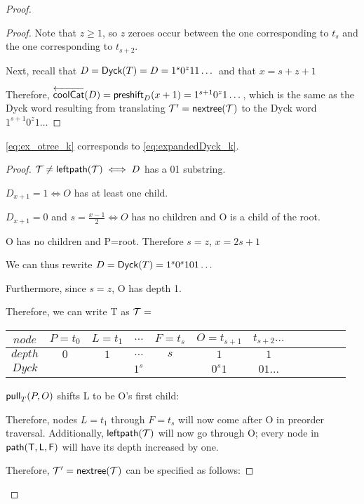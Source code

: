 \begin{proof}
\begin{proof}
    Note that $z \ge 1$, so $z$ zeroes occur between the one corresponding to $t_{s}$ and the one corresponding to $t_{s+2}$.


    Next, recall that $D=\dyck{T}=D=1^s0^z11\dots$ and that $x=s+z+1$

    Therefore, $\coolCat{D}=\preshift{D}{x+1}=1^{s+1}0^z1\dots$, which is the same as the Dyck word resulting from translating $\tree{T}'=\nextTree{T}$ to the Dyck word $1^{s+1}0^z1\dots$

\end{proof}
\begin{lemma}
    \eqref{eq:ex_otree_k} corresponds to \eqref{eq:expandedDyck_k}.
\end{lemma}
\begin{proof}

    $\tree{T} \ne \leftdown{\tree{T}} \iff D$ has a 01 substring.

    $D_{x+1}=1 \iff O$ has at least one child.

    $D_{x+1}=0$ and $s=\frac{x-1}{2} \iff O$ has no children and O is a child of the root.

    O has no children and P=root. Therefore $s=z$, $x=2s+1$

    We can thus rewrite $D=\dyck{T}=1^s0^s101\dots$

    Furthermore, since $s=z$, O has depth 1. 

    Therefore, we can write T as 
    \noindent $\tree{T}=$
    \begin{center}
	\begin{tabular}{ |c|c|c|c|c|c|c|c|c|c|c|c| } 
	    \hline

	    $node$ & $P=t_0$ & $L=t_1$ & $\dots$ & $F=t_s$ & $O=t_{s+1}$ & $t_{s+2}\dots$ \\
	    \hline
	    $depth$ & $0$ & $1$ & $\dots$ & $s$ & $1$ & $1$ \\
	    \hline
	    $Dyck$ &  &  \multicolumn{3}{|c|}{$1^s$} &  $0^{s}1$   & $01\dots$\\
	    \hline
	\end{tabular}
    \end{center}


    $\poppush[T]{P}{O}$
    shifts L to be O's first child:

    Therefore, nodes $L=t_{1}$ through $F=t_s$ will now come after O in preorder traversal.  Additionally, $\leftdown{\tree{T}}$ will now go through O; every node in $\pathto{T}{L}{F}$ will have its depth increased by one.  

    Therefore, $\tree{T}'=\nextTree{T}$ can be specified as follows: 


\end{proof}
\end{proof}
